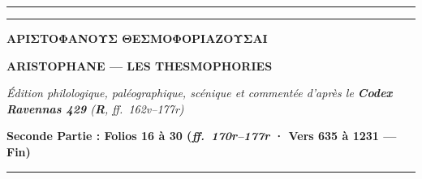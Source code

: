 \documentclass[11pt,twoside]{book}
\newlength{\larg}
\begin{document}
\thispagestyle{empty}
\vspace*{0.6cm}
\begin{center}
  {\color{ruleGold}\rule{\textwidth}{1.2pt}}\par\vspace{2pt}
  {\color{ruleGold}\rule{\textwidth}{0.4pt}}\par\vspace{0.55cm}

  {\fontsize{26pt}{32pt}\selectfont\bfseries\color{rubricRed}\policeGr ΑΡΙΣΤΟΦΑΝΟΥΣ ΘΕΣΜΟΦΟΡΙΑΖΟΥΣΑΙ}\par\vspace{0.30cm}
  {\fontsize{20pt}{24pt}\selectfont\scshape\bfseries ARISTOPHANE — LES THESMOPHORIES}\par\vspace{0.28cm}
  {\large\itshape\color{sepiaNote}Édition philologique, paléographique, scénique et commentée d'après le \textbf{Codex Ravennas 429} (\textbf{R}, ff.~162v–177r)}\par\vspace{0.15cm}
  {\normalsize\bfseries\color{rubricRed}Seconde Partie : Folios 16 à 30 (\textit{ff.~170r–177r} · Vers 635 à 1231 — Fin)}\par\vspace{0.45cm}

  {\color{ruleGold}\rule{0.45\textwidth}{0.6pt}}\par\vspace{0.45cm}
\end{center}
\end{document}

